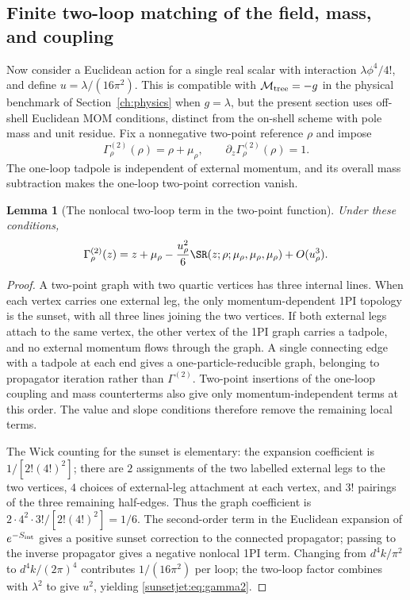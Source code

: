 \documentclass[11pt,a4paper,oneside]{article}
\theoremstyle{plain}
\newtheorem{lemma}[theorem]{Lemma}
\theoremstyle{definition}
\theoremstyle{remark}
\numberwithin{equation}{section}
\begin{document}
\subsection{Finite two-loop matching of the field, mass, and coupling}\label{sunsetjet:sec:field}
Now consider a Euclidean action for a single real scalar with interaction $\lambda\phi^4/4!$,
and define $u=\lambda/(16\pi^2)$.
This is compatible with $\mathcal M_{\rm tree}=-g$ in the physical benchmark of Section~\ref{ch:physics} when $g=\lambda$,
but the present section uses off-shell Euclidean MOM conditions, distinct from the on-shell scheme with pole mass and unit residue.
Fix a nonnegative two-point reference $\rho$ and impose
\begin{equation}\label{sunsetjet:eq:2conditions}
 \Gamma^{(2)}_\rho(\rho)=\rho+\mu_\rho,
 \qquad \partial_z\Gamma^{(2)}_\rho(\rho)=1.
\end{equation}
The one-loop tadpole is independent of external momentum, and its overall mass subtraction makes the one-loop two-point correction vanish.

\begin{lemma}[The nonlocal two-loop term in the two-point function]\label{sunsetjet:lem:weight}
Under these conditions,
\begin{equation}\label{sunsetjet:eq:gamma2}
 \Gamma^{(2)}_\rho(z)=z+\mu_\rho
       -\frac{u_\rho^2}{6}\SR(z;\rho;\mu_\rho,\mu_\rho,\mu_\rho)
       +O(u_\rho^3).
\end{equation}
\end{lemma}
\begin{proof}
A two-point graph with two quartic vertices has three internal lines.
When each vertex carries one external leg, the only momentum-dependent 1PI topology is the sunset, with all three lines joining the two vertices.
If both external legs attach to the same vertex, the other vertex of the 1PI graph carries a tadpole, and no external momentum flows through the graph.
A single connecting edge with a tadpole at each end gives a one-particle-reducible graph, belonging to propagator iteration rather than $\Gamma^{(2)}$.
Two-point insertions of the one-loop coupling and mass counterterms also give only momentum-independent terms at this order.
The value and slope conditions therefore remove the remaining local terms.

The Wick counting for the sunset is elementary: the expansion coefficient is
$1/[2!(4!)^2]$;
there are $2$ assignments of the two labelled external legs to the two vertices,
$4$ choices of external-leg attachment at each vertex, and $3!$ pairings of the three remaining half-edges.
Thus the graph coefficient is $2\cdot4^2\cdot3!/[2!(4!)^2]=1/6$.
The second-order term in the Euclidean expansion of $e^{-S_{\rm int}}$ gives a positive sunset correction to the connected propagator;
passing to the inverse propagator gives a negative nonlocal 1PI term.
Changing from $d^4k/\pi^2$ to $d^4k/(2\pi)^4$ contributes $1/(16\pi^2)$ per loop;
the two-loop factor combines with $\lambda^2$ to give $u^2$, yielding \eqref{sunsetjet:eq:gamma2}.
\end{proof}
\end{document}
